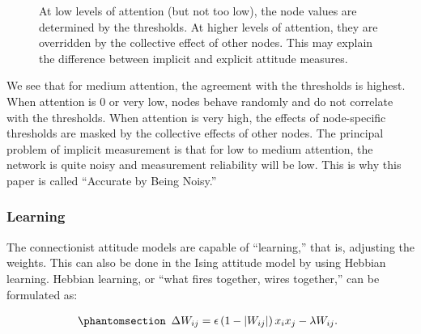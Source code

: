 \documentclass[
  a4paper,
  DIV=11,
  numbers=noendperiod,
  oneside]{scrreprt}
\begin{document}
\begin{figure}


\caption{\label{fig-ch6-img13-old-82}At low levels of attention (but not
too low), the node values are determined by the thresholds. At higher
levels of attention, they are overridden by the collective effect of
other nodes. This may explain the difference between implicit and
explicit attitude measures.}

\end{figure}%

We see that for medium attention, the agreement with the thresholds is
highest. When attention is 0 or very low, nodes behave randomly and do
not correlate with the thresholds. When attention is very high, the
effects of node-specific thresholds are masked by the collective effects
of other nodes. The principal problem of implicit measurement is that
for low to medium attention, the network is quite noisy and measurement
reliability will be low. This is why this paper is called ``Accurate by
Being Noisy.''

\subsubsection{Learning}\label{sec-Learning}

The connectionist attitude models are capable of ``learning,'' that is,
adjusting the weights. This can also be done in the Ising attitude model
by using Hebbian learning. Hebbian learning, or ``what fires together,
wires together,'' can be formulated as:

\begin{equation}\phantomsection\label{eq-ch6-6-old-47}{\begin{array}{r}
\mathrm{\Delta}W_{ij} = \epsilon\left( 1 - \left| W_{ij} \right| \right)x_{i}x_{j} - \lambda W_{ij}.
\end{array}}\end{equation}
\end{document}

